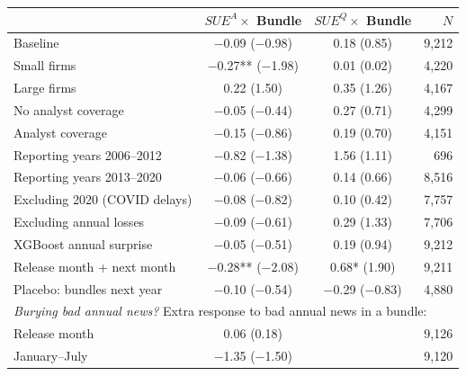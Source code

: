 \begin{tabular}{lccr}
\toprule
 & $SUE^{A}\times$ Bundle & $SUE^{Q}\times$ Bundle & $N$\\
\midrule
Baseline & \ensuremath{-}0.09 (\ensuremath{-}0.98) & 0.18 (0.85) & 9,212\\
Small firms & \ensuremath{-}0.27** (\ensuremath{-}1.98) & 0.01 (0.02) & 4,220\\
Large firms & 0.22 (1.50) & 0.35 (1.26) & 4,167\\
No analyst coverage & \ensuremath{-}0.05 (\ensuremath{-}0.44) & 0.27 (0.71) & 4,299\\
Analyst coverage & \ensuremath{-}0.15 (\ensuremath{-}0.86) & 0.19 (0.70) & 4,151\\
Reporting years 2006--2012 & \ensuremath{-}0.82 (\ensuremath{-}1.38) & 1.56 (1.11) & 696\\
Reporting years 2013--2020 & \ensuremath{-}0.06 (\ensuremath{-}0.66) & 0.14 (0.66) & 8,516\\
Excluding 2020 (COVID delays) & \ensuremath{-}0.08 (\ensuremath{-}0.82) & 0.10 (0.42) & 7,757\\
Excluding annual losses & \ensuremath{-}0.09 (\ensuremath{-}0.61) & 0.29 (1.33) & 7,706\\
XGBoost annual surprise & \ensuremath{-}0.05 (\ensuremath{-}0.51) & 0.19 (0.94) & 9,212\\
Release month + next month & \ensuremath{-}0.28** (\ensuremath{-}2.08) & 0.68* (1.90) & 9,211\\
Placebo: bundles next year & \ensuremath{-}0.10 (\ensuremath{-}0.54) & \ensuremath{-}0.29 (\ensuremath{-}0.83) & 4,880\\
\midrule
\multicolumn{4}{l}{\emph{Burying bad annual news?} Extra response to bad annual news in a bundle:}\\
\quad Release month & 0.06 (0.18) & & 9,126\\
\quad January--July & \ensuremath{-}1.35 (\ensuremath{-}1.50) & & 9,120\\
\bottomrule
\end{tabular}